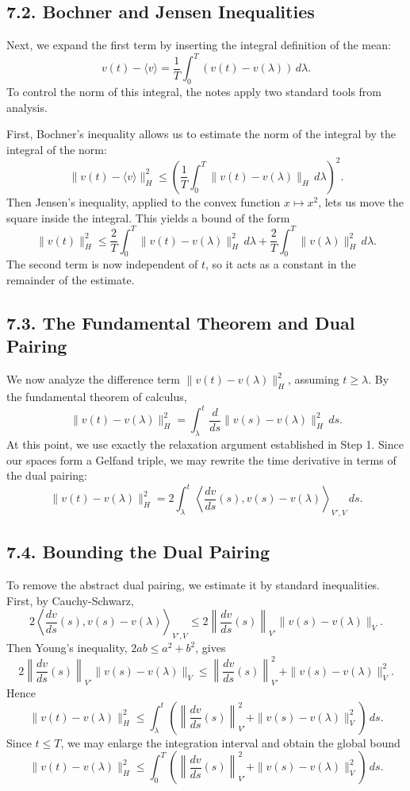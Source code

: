 \documentclass[11pt]{article}
\theoremstyle{definition}
\theoremstyle{remark}
\begin{document}
\subsection*{7.2. Bochner and Jensen Inequalities}
Next, we expand the first term by inserting the integral definition of the mean:
\[
v(t)-\langle v\rangle
=
\frac{1}{T}\int_0^T (v(t)-v(\lambda))\,d\lambda.
\]
To control the norm of this integral, the notes apply two standard tools from analysis.

First, Bochner's inequality allows us to estimate the norm of the integral by the integral of the norm:
\[
\|v(t)-\langle v\rangle\|_H^2
\le
\left(\frac{1}{T}\int_0^T \|v(t)-v(\lambda)\|_H\,d\lambda\right)^2.
\]
Then Jensen's inequality, applied to the convex function \(x\mapsto x^2\), lets us move the square inside the integral. This yields a bound of the form
\[
\|v(t)\|_H^2
\le
\frac{2}{T}\int_0^T \|v(t)-v(\lambda)\|_H^2\,d\lambda
+
\frac{2}{T}\int_0^T \|v(\lambda)\|_H^2\,d\lambda.
\]
The second term is now independent of \(t\), so it acts as a constant in the remainder of the estimate.

\subsection*{7.3. The Fundamental Theorem and Dual Pairing}
We now analyze the difference term \(\|v(t)-v(\lambda)\|_H^2\), assuming \(t\ge \lambda\). By the fundamental theorem of calculus,
\[
\|v(t)-v(\lambda)\|_H^2
=
\int_\lambda^t \frac{d}{ds}\|v(s)-v(\lambda)\|_H^2\,ds.
\]
At this point, we use exactly the relaxation argument established in Step 1. Since our spaces form a Gelfand triple, we may rewrite the time derivative in terms of the dual pairing:
\[
\|v(t)-v(\lambda)\|_H^2
=
2\int_\lambda^t \left\langle \frac{dv}{ds}(s),v(s)-v(\lambda)\right\rangle_{V',V}\,ds.
\]

\subsection*{7.4. Bounding the Dual Pairing}
To remove the abstract dual pairing, we estimate it by standard inequalities. First, by Cauchy-Schwarz,
\[
2\left\langle \frac{dv}{ds}(s),v(s)-v(\lambda)\right\rangle_{V',V}
\le
2\left\|\frac{dv}{ds}(s)\right\|_{V'}\|v(s)-v(\lambda)\|_V.
\]
Then Young's inequality, \(2ab\le a^2+b^2\), gives
\[
2\left\|\frac{dv}{ds}(s)\right\|_{V'}\|v(s)-v(\lambda)\|_V
\le
\left\|\frac{dv}{ds}(s)\right\|_{V'}^2+\|v(s)-v(\lambda)\|_V^2.
\]
Hence
\[
\|v(t)-v(\lambda)\|_H^2
\le
\int_\lambda^t
\left(
\left\|\frac{dv}{ds}(s)\right\|_{V'}^2+\|v(s)-v(\lambda)\|_V^2
\right)\,ds.
\]
Since \(t\le T\), we may enlarge the integration interval and obtain the global bound
\[
\|v(t)-v(\lambda)\|_H^2
\le
\int_0^T
\left(
\left\|\frac{dv}{ds}(s)\right\|_{V'}^2+\|v(s)-v(\lambda)\|_V^2
\right)\,ds.
\]
\end{document}
